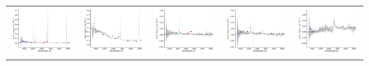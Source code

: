 \begin{center}
\begin{longtable}{l l l l l }
    \includegraphics[width=0.19\linewidth, clip]{Figs/Figs-sdss/spec-3590-55201-0554-STRIPE82-0018-038274.pdf} & \includegraphics[width=0.19\linewidth, clip]{Figs/Figs-sdss/spec-3609-55201-0610-STRIPE82-0044-021486.pdf} & \includegraphics[width=0.19\linewidth, clip]{Figs/Figs-sdss/spec-3775-55207-0067-SPLUS-n03s19-045911.pdf} & \includegraphics[width=0.19\linewidth, clip]{Figs/Figs-sdss/spec-3776-55209-0054-SPLUS-n03s23-033092.pdf} & \includegraphics[width=0.19\linewidth, clip]{Figs/Figs-sdss/spec-3776-55209-0768-SPLUS-n02s22-016624.pdf} \\

\end{longtable}
\end{center}
